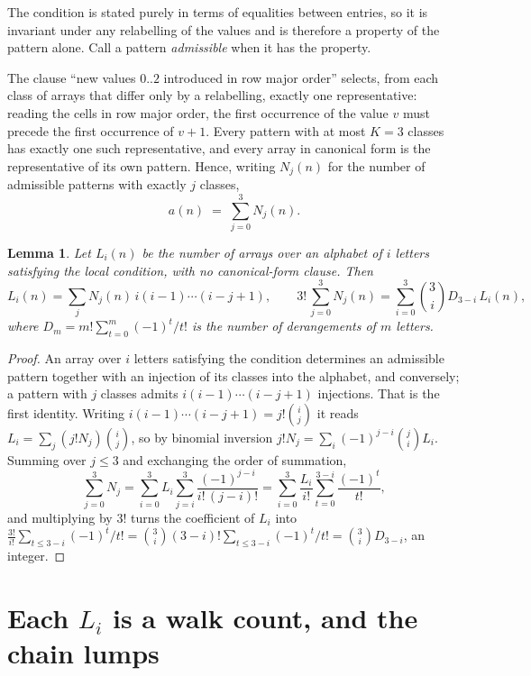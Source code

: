 \documentclass[11pt,a4paper]{article}
\theoremstyle{plain}
\newtheorem{lemma}[theorem]{Lemma}
\theoremstyle{definition}
\begin{document}
The condition is stated purely in terms of equalities between entries, so it is invariant
under any relabelling of the values and is therefore a property of the pattern alone. Call a
pattern \emph{admissible} when it has the property.

The clause ``new values $0..2$ introduced in row major order'' selects, from each class
of arrays that differ only by a relabelling, exactly one representative: reading the cells in
row major order, the first occurrence of the value $v$ must precede the first occurrence of
$v+1$. Every pattern with at most $K=3$ classes has exactly one such representative, and
every array in canonical form is the representative of its own pattern. Hence, writing
$N_j(n)$ for the number of admissible patterns with exactly $j$ classes,
\begin{equation}\label{eq:apat}
a(n)\;=\;\sum_{j=0}^{3}N_j(n).
\end{equation}

\begin{lemma}\label{lem:inv}
Let $L_i(n)$ be the number of arrays over an alphabet of $i$ letters satisfying the local
condition, with no canonical-form clause. Then
\[
L_i(n)=\sum_j N_j(n)\,i(i-1)\cdots(i-j+1),
\qquad
3!\,\sum_{j=0}^{3}N_j(n)=\sum_{i=0}^{3}\binom{3}{i}D_{3-i}\,L_i(n),
\]
where $D_m=m!\sum_{t=0}^{m}(-1)^t/t!$ is the number of derangements of $m$ letters.
\end{lemma}

\begin{proof}
An array over $i$ letters satisfying the condition determines an admissible pattern together
with an injection of its classes into the alphabet, and conversely; a pattern with $j$
classes admits $i(i-1)\cdots(i-j+1)$ injections. That is the first identity. Writing
$i(i-1)\cdots(i-j+1)=j!\binom{i}{j}$ it reads $L_i=\sum_j (j!N_j)\binom{i}{j}$, so by
binomial inversion $j!N_j=\sum_{i}(-1)^{j-i}\binom{j}{i}L_i$. Summing over
$j\le 3$ and exchanging the order of summation,
\[
\sum_{j=0}^{3}N_j=\sum_{i=0}^{3}L_i\sum_{j=i}^{3}\frac{(-1)^{j-i}}{i!\,(j-i)!}
=\sum_{i=0}^{3}\frac{L_i}{i!}\sum_{t=0}^{3-i}\frac{(-1)^t}{t!} ,
\]
and multiplying by $3!$ turns the coefficient of $L_i$ into
$\frac{3!}{i!}\sum_{t\le 3-i}(-1)^t/t!=\binom{3}{i}(3-i)!\sum_{t\le 3-i}(-1)^t/t!
=\binom{3}{i}D_{3-i}$, an integer.
\end{proof}

\section{Each $L_i$ is a walk count, and the chain lumps}
\end{document}
